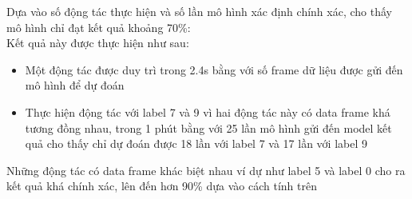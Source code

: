 Dựa vào số động tác thực hiện và số lần mô hình xác định chính xác, cho thấy mô hình chỉ đạt kết quả khoảng 70\%: \\

Kết quả này được thực hiện như sau:\\
\begin{itemize}
    \item Một động tác được duy trì trong 2.4s bằng với số frame dữ liệu được gửi đến mô hình để dự đoán
    \item Thực hiện động tác với label 7 và 9 vì hai động tác này có data frame khá tương đồng nhau,  trong 1 phút bằng với 25 lần mô hình gửi đến model kết quả cho thấy chỉ dự đoán được 18 lần với label 7 và 17 lần với label 9
\end{itemize}
Những động tác có data frame khác biệt nhau ví dự như label 5 và label 0 cho ra kết quả khá chính xác, lên đến hơn 90\% dựa vào cách tính trên


